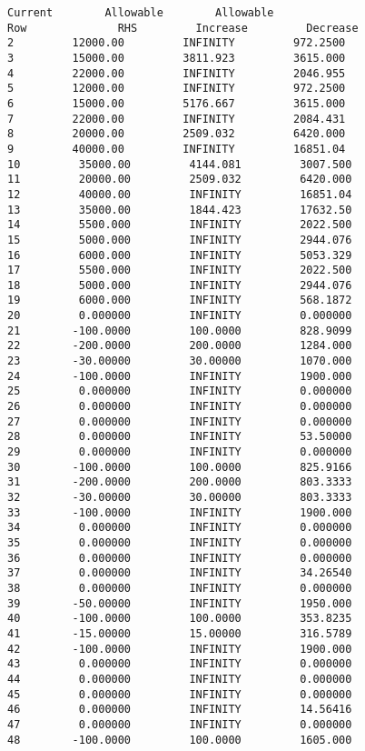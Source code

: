 \documentclass[12pt]{article}
\begin{document}
\begin{appendices}
\begin{lstlisting}
Current        Allowable        Allowable
Row              RHS         Increase         Decrease
2         12000.00         INFINITY         972.2500
3         15000.00         3811.923         3615.000
4         22000.00         INFINITY         2046.955
5         12000.00         INFINITY         972.2500
6         15000.00         5176.667         3615.000
7         22000.00         INFINITY         2084.431
8         20000.00         2509.032         6420.000
9         40000.00         INFINITY         16851.04
10         35000.00         4144.081         3007.500
11         20000.00         2509.032         6420.000
12         40000.00         INFINITY         16851.04
13         35000.00         1844.423         17632.50
14         5500.000         INFINITY         2022.500
15         5000.000         INFINITY         2944.076
16         6000.000         INFINITY         5053.329
17         5500.000         INFINITY         2022.500
18         5000.000         INFINITY         2944.076
19         6000.000         INFINITY         568.1872
20         0.000000         INFINITY         0.000000
21        -100.0000         100.0000         828.9099
22        -200.0000         200.0000         1284.000
23        -30.00000         30.00000         1070.000
24        -100.0000         INFINITY         1900.000
25         0.000000         INFINITY         0.000000
26         0.000000         INFINITY         0.000000
27         0.000000         INFINITY         0.000000
28         0.000000         INFINITY         53.50000
29         0.000000         INFINITY         0.000000
30        -100.0000         100.0000         825.9166
31        -200.0000         200.0000         803.3333
32        -30.00000         30.00000         803.3333
33        -100.0000         INFINITY         1900.000
34         0.000000         INFINITY         0.000000
35         0.000000         INFINITY         0.000000
36         0.000000         INFINITY         0.000000
37         0.000000         INFINITY         34.26540
38         0.000000         INFINITY         0.000000
39        -50.00000         INFINITY         1950.000
40        -100.0000         100.0000         353.8235
41        -15.00000         15.00000         316.5789
42        -100.0000         INFINITY         1900.000
43         0.000000         INFINITY         0.000000
44         0.000000         INFINITY         0.000000
45         0.000000         INFINITY         0.000000
46         0.000000         INFINITY         14.56416
47         0.000000         INFINITY         0.000000
48        -100.0000         100.0000         1605.000

\end{lstlisting}
\end{appendices}
\end{document}
